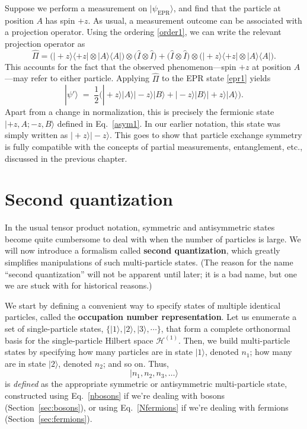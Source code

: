 \documentclass[pra,12pt]{revtex4}
\begin{document}
Suppose we perform a measurement on $|\psi_{\mathrm{EPR}}\rangle$, and
find that the particle at position $A$ has spin $+z$.  As usual, a
measurement outcome can be associated with a projection operator.
Using the ordering \eqref{order1}, we can write the relevant
projection operator as
\begin{equation}
  \hat{\Pi} = \Big(|\!+\!z\rangle \langle+z| \otimes |A\rangle \langle A|\Big)
  \otimes\Big( \hat{I} \otimes \hat{I}\Big)
  + \Big(\hat{I} \otimes \hat{I} \Big) \otimes \Big(
  |\!+\!z\rangle \langle+z| \otimes |A\rangle \langle A| \Big).
\end{equation}
This accounts for the fact that the observed phenomenon---spin $+z$ at
position $A$---may refer to either particle.  Applying $\hat{\Pi}$ to
the EPR state \eqref{epr1} yields
\begin{equation}
  |\psi'\rangle \;=\;
  \frac{1}{2} \Big(
    |\!+\!z\rangle|A\rangle |\!-\!z\rangle|B\rangle
    + |\!-\!z\rangle|B\rangle |\!+\!z\rangle|A\rangle \Big).
\end{equation}
Apart from a change in normalization, this is precisely the fermionic
state $|+\!z,A;-z,B\rangle$ defined in Eq.~\eqref{asym1}.  In our
earlier notation, this state was simply written as
$|\!+\!z\rangle|-\!z\rangle$.  This goes to show that particle
exchange symmetry is fully compatible with the concepts of partial
measurements, entanglement, etc., discussed in the previous chapter.

\section{Second quantization}

In the usual tensor product notation, symmetric and antisymmetric
states become quite cumbersome to deal with when the number of
particles is large.  We will now introduce a formalism called
\textbf{second quantization}, which greatly simplifies manipulations
of such multi-particle states.  (The reason for the name ``second
quantization'' will not be apparent until later; it is a bad name, but
one we are stuck with for historical reasons.)

We start by defining a convenient way to specify states of multiple
identical particles, called the \textbf{occupation number
  representation}.  Let us enumerate a set of single-particle states,
$\{|1\rangle, |2\rangle, |3\rangle, \cdots\}$, that form a complete
orthonormal basis for the single-particle Hilbert space
$\mathscr{H}^{(1)}$.  Then, we build multi-particle states by
specifying how many particles are in state $|1\rangle$, denoted $n_1$;
how many are in state $|2\rangle$, denoted $n_2$; and so on.  Thus,
\begin{equation*}
  |n_1,n_2,n_3,\dots\rangle
\end{equation*}
is \textit{defined} as the appropriate symmetric or antisymmetric
multi-particle state, constructed using Eq.~\eqref{nbosons} if we're
dealing with bosons (Section~\ref{sec:bosons}), or using
Eq.~\eqref{Nfermions} if we're dealing with fermions
(Section~\ref{sec:fermions}).
\end{document}
